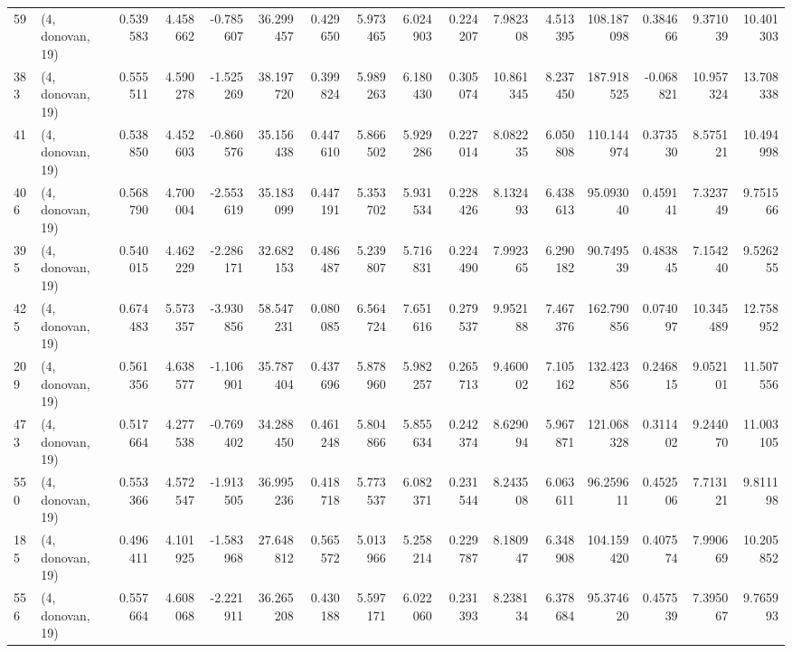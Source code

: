 \begin{tabular}{llrrrrrrrrrrrrrr}
59  &  (4, donovan, 19) &   0.539583 &   4.458662 &  -0.785607 &    36.299457 &   0.429650 &   5.973465 &   6.024903 &  0.224207 &   7.982308 &   4.513395 &   108.187098 &  0.384666 &   9.371039 &  10.401303 \\
383 &  (4, donovan, 19) &   0.555511 &   4.590278 &  -1.525269 &    38.197720 &   0.399824 &   5.989263 &   6.180430 &  0.305074 &  10.861345 &   8.237450 &   187.918525 & -0.068821 &  10.957324 &  13.708338 \\
41  &  (4, donovan, 19) &   0.538850 &   4.452603 &  -0.860576 &    35.156438 &   0.447610 &   5.866502 &   5.929286 &  0.227014 &   8.082235 &   6.050808 &   110.144974 &  0.373530 &   8.575121 &  10.494998 \\
406 &  (4, donovan, 19) &   0.568790 &   4.700004 &  -2.553619 &    35.183099 &   0.447191 &   5.353702 &   5.931534 &  0.228426 &   8.132493 &   6.438613 &    95.093040 &  0.459141 &   7.323749 &   9.751566 \\
395 &  (4, donovan, 19) &   0.540015 &   4.462229 &  -2.286171 &    32.682153 &   0.486487 &   5.239807 &   5.716831 &  0.224490 &   7.992365 &   6.290182 &    90.749539 &  0.483845 &   7.154240 &   9.526255 \\
425 &  (4, donovan, 19) &   0.674483 &   5.573357 &  -3.930856 &    58.547231 &   0.080085 &   6.564724 &   7.651616 &  0.279537 &   9.952188 &   7.467376 &   162.790856 &  0.074097 &  10.345489 &  12.758952 \\
209 &  (4, donovan, 19) &   0.561356 &   4.638577 &  -1.106901 &    35.787404 &   0.437696 &   5.878960 &   5.982257 &  0.265713 &   9.460002 &   7.105162 &   132.423856 &  0.246815 &   9.052101 &  11.507556 \\
473 &  (4, donovan, 19) &   0.517664 &   4.277538 &  -0.769402 &    34.288450 &   0.461248 &   5.804866 &   5.855634 &  0.242374 &   8.629094 &   5.967871 &   121.068328 &  0.311402 &   9.244070 &  11.003105 \\
550 &  (4, donovan, 19) &   0.553366 &   4.572547 &  -1.913505 &    36.995236 &   0.418718 &   5.773537 &   6.082371 &  0.231544 &   8.243508 &   6.063611 &    96.259611 &  0.452506 &   7.713121 &   9.811198 \\
185 &  (4, donovan, 19) &   0.496411 &   4.101925 &  -1.583968 &    27.648812 &   0.565572 &   5.013966 &   5.258214 &  0.229787 &   8.180947 &   6.348908 &   104.159420 &  0.407574 &   7.990669 &  10.205852 \\
556 &  (4, donovan, 19) &   0.557664 &   4.608068 &  -2.221911 &    36.265208 &   0.430188 &   5.597171 &   6.022060 &  0.231393 &   8.238134 &   6.378684 &    95.374620 &  0.457539 &   7.395067 &   9.765993 \\

\end{tabular}

